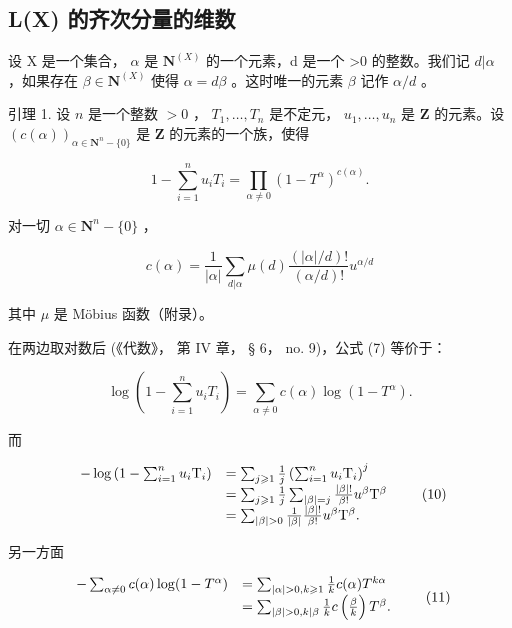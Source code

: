 \subsection{L(X) 的齐次分量的维数}

设 X 是一个集合， \(\alpha\) 是 \(\mathbf{N}^{(X)}\) 的一个元素，d 是一个 >0 的整数。我们记 \(d|\alpha\) ，如果存在 \(\beta\in\mathbf{N}^{(X)}\) 使得 \(\alpha=d\beta\) 。这时唯一的元素 \(\beta\) 记作 \(\alpha/d\) 。

引理 1. 设 \(n\) 是一个整数 \(>0\) ， \(T_1, \ldots, T_n\) 是不定元， \(u_1, \ldots, u_n\) 是 \(\mathbf{Z}\) 的元素。设 \((c(\alpha))_{\alpha \in \mathbf{N}^n - \{0\}}\) 是 \(\mathbf{Z}\) 的元素的一个族，使得

\[
1 - \sum_ {i = 1} ^ {n} u _ {i} T _ {i} = \prod_ {\alpha \neq 0} (1 - T ^ {\alpha}) ^ {c (\alpha)}.\tag{7}
\]

对一切 \(\alpha \in \mathbf{N}^n - \{0\}\) ，

\[
c (\alpha) = \frac {1}{| \alpha |} \sum_ {d | \alpha} \mu (d) \frac {(| \alpha | / d) !}{(\alpha / d) !} u ^ {\alpha / d}\tag{8}
\]

其中 \(\mu\) 是 Möbius 函数（附录）。

在两边取对数后 (《代数》， 第 IV 章， § 6， no. 9)，公式 (7) 等价于：

\[
\log \left(1 - \sum_ {i = 1} ^ {n} u _ {i} T _ {i}\right) = \sum_ {\alpha \neq 0} c (\alpha) \log (1 - T ^ {\alpha}).\tag{9}
\]

而

\[
\begin{array}{r l} - \log \left(1 - \sum_ {i = 1} ^ {n} u _ {i} \mathrm{T} _ {i}\right) & = \sum_ {j \geqslant 1} \frac {1}{j} \left(\sum_ {i = 1} ^ {n} u _ {i} \mathrm{T} _ {i}\right) ^ {j} \\ & = \sum_ {j \geqslant 1} \frac {1}{j} \sum_ {| \beta | = j} \frac {| \beta | !}{\beta !} u ^ {\beta} \mathrm{T} ^ {\beta} \\ & = \sum_ {| \beta | > 0} \frac {1}{| \beta |} \frac {| \beta | !}{\beta !} u ^ {\beta} \mathrm{T} ^ {\beta}. \end{array}\tag{10}
\]

另一方面

\[
\begin{array}{r l} - \sum_ {\alpha \neq 0} c (\alpha) \log (1 - T ^ {\alpha}) & = \sum_ {| \alpha | > 0, k \geqslant 1} \frac {1}{k} c (\alpha) T ^ {k \alpha} \\ & = \sum_ {| \beta | > 0, k | \beta} \frac {1}{k} c \left(\frac {\beta}{k}\right) T ^ {\beta}. \end{array}\tag{11}
\]

